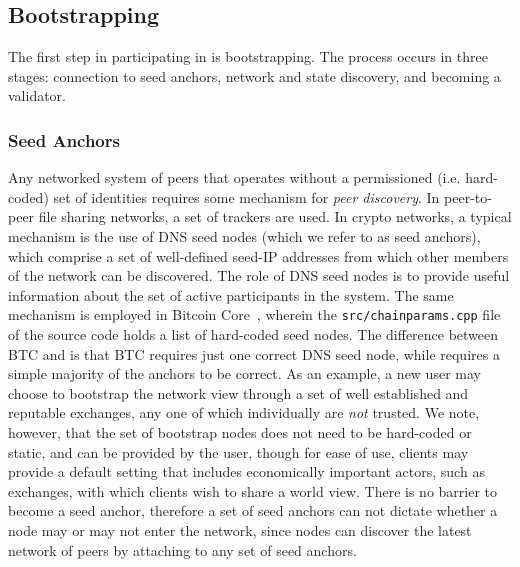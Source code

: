 \documentclass[runningheads]{llncs}
\begin{document}

\subsection{Bootstrapping}
The first step in participating in \AVAPlatformName{} is bootstrapping. The process occurs in three stages: connection to seed anchors, network and state discovery, and becoming a validator. 

\subsubsection{Seed Anchors}
Any networked system of peers that operates without a permissioned (i.e. hard-coded) set of identities requires some mechanism for \emph{peer discovery}. 
In peer-to-peer file sharing networks, a set of trackers are used. 
In crypto networks, a typical mechanism is the use of DNS seed nodes (which we refer to as seed anchors), which comprise a set of well-defined seed-IP addresses from which other members of the network can be discovered. 
The role of DNS seed nodes is to provide useful information about the set of active participants in the system. 
The same mechanism is employed in Bitcoin Core~\cite{bitcoin_2018}, wherein the \texttt{src/chainparams.cpp} file of the source code holds a list of hard-coded seed nodes. 
The difference between BTC and \AVAPlatformName{} is that BTC requires just one correct DNS seed node, while \AVAPlatformName{} requires a simple majority of the anchors to be correct. 
As an example, a new user may choose to bootstrap the network view through a set of well established and reputable exchanges, any one of which individually are \emph{not} trusted. 
We note, however, that the set of bootstrap nodes does not need to be hard-coded or static, and can be provided by the user, though for ease of use, clients may provide a default setting that includes economically important actors, such as exchanges, with which clients wish to share a world view. 
There is no barrier to become a seed anchor, therefore a set of seed anchors can not dictate whether a node may or may not enter the network, since nodes can discover the latest network of \AVAPlatformName{} peers by attaching to any set of seed anchors.
\end{document}
